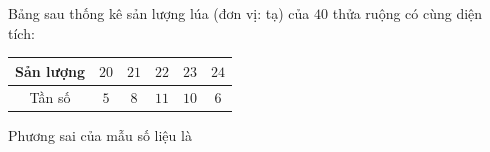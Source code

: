 \begin{ex}
Bảng sau thống kê sản lượng lúa (đơn vị: tạ) của $40$ thửa ruộng có cùng diện tích:
\begin{center}
\begin{tabular}{|c|c|c|c|c|c|}\hline
Sản lượng & $20$ & $21$ & $22$ & $23$ & $24$\\\hline
Tần số & $5$ & $8$ & $11$ & $10$ & $6$\\\hline
\end{tabular}
\end{center}
Phương sai của mẫu số liệu là
\end{ex}
